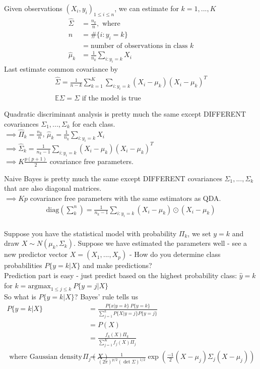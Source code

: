 \documentclass[12pt, letterpaper]{article}
\begin{document}
\noindent Given observations $(X_i, y_i)_{1\le i \le n}$, we can estimate for $k = 1,...,K$
\begin{align*}
    \hat \Sigma &= \frac{n_k}{n}, \text{ where} \\
    n &= \# \{i:y_i=k\}\\ 
    &= \text{number of observations in class } k \\
    \hat \mu_k &= \frac{1}{n_k}\sum_{i:y_i=k}X_i
\end{align*}
Last estimate common covariance by 
\begin{align*}
    \hat \Sigma = \frac{1}{n-k} \sum_{k=1}^{K} \sum_{i:y_i=k} (X_i-\mu_k)(X_i-\mu_k)^T \\ 
    \mathbb{E} \hat \Sigma = \Sigma \text{ if the model is true}
\end{align*}

\noindent {} Quadratic discriminant analysis is pretty much the same except DIFFERENT covariances $\Sigma_1,...,\Sigma_k$
for each class. \\
$\implies \hat \Pi_k = \frac{n_k}{n}$, $\hat \mu_k = \frac{1}{n_k}\sum_{i:y_i=k} X_i$ \\
$\implies \hat \Sigma_k = \frac{1}{n_k-1} \sum_{i:y_i=k}(X_i-\mu_k)(X_i-\mu_k)^T$ \\
$\implies K\frac{p(p+1)}{2}$ covariance free parameters.

\noindent {} Naive Bayes is pretty much the same except DIFFERENT covariances $\Sigma_1, ..., \Sigma_k$
that are also diagonal matrices.\\
$\implies Kp$ covariance free parameters with the same estimators as QDA.
\begin{align*}
    \text{diag}\left(\sum_{k}^{n}\right) = \frac{1}{n_k-1} \sum_{i:y_i=k} (X_i-\mu_k)\odot(X_i-\mu_k)
\end{align*} \\

\noindent Suppose you have the statistical model with probability $\Pi_k$, we set $y=k$ and draw
$X\sim N(\mu_k,\Sigma_k)$. Suppose we have estimated the parameters well - see a new 
predictor vector $X = (X_1,...,X_p)$ - How do you determine class probabilities $P\{y= k |X\}$ and make predictions?\\

\noindent Prediction part is easy - just predict based on the highest probability class:
$\hat y = k$ for $k= \text{argmax}_{1\le j\le k}\  P\{y=j |X\}$ \\ 

\noindent So what is $P\{y=k |X\}$? Bayes' rule tells us 
\begin{align*}
    P\{y=k|X\} &= \frac{P\{x|y=k\}\ P\{y=k\}}{\sum_{j=1}^{k}P\{X|y=j\}P\{y=j\}} \\
    &= P(X) \\ 
    &= \frac{f_k(X)\Pi_k}{\sum_{j=1}^{K}f_j(X)\Pi_j} \\
    \text{ where Gaussian density } \Pi_j(X) &= \frac{1}{(2\pi)^{p/2}(\det\Sigma)^{1/2}}\exp(\frac{-1}{2}(X-\mu_j)\Sigma_j(X-\mu_j))
\end{align*}
\end{document}
